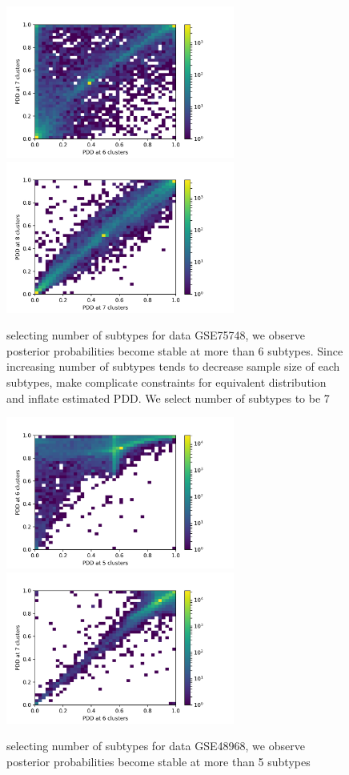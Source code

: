 \documentclass[11pt]{amsart}
\begin{document}
\begin{figure}[H]
  \includegraphics[height = 5cm, width=\linewidth]{DN_67.png}
\endminipage\hfill
{}
  \includegraphics[height = 5cm, width=\linewidth]{DN_78.png}
\endminipage\hfill
\caption{selecting number of subtypes for data GSE75748, we observe posterior probabilities become stable at more than 6 subtypes. Since increasing number of subtypes tends to decrease sample size of each subtypes, make complicate constraints for equivalent distribution and inflate estimated PDD.  We select number of subtypes to be 7}
\end{figure}
\begin{figure}[H]
  \includegraphics[height = 5cm, width=\linewidth]{G48_56.png}
\endminipage\hfill
{}
  \includegraphics[height = 5cm, width=\linewidth]{G48_67.png}
\endminipage\hfill
\caption{selecting number of subtypes for data GSE48968, we observe posterior probabilities become stable at more than 5 subtypes}
\end{figure}
\end{document}
